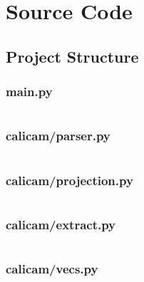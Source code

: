 \section{Source Code}

\subsection*{Project Structure}


\subsubsection*{main.py} \label{code:main}
\inputminted{python}{./calicam/main.py}

\subsubsection*{calicam/parser.py} \label{code:parser}
\inputminted{python}{./calicam/calicam/parser.py}

\subsubsection*{calicam/projection.py} \label{code:projection}
\inputminted{python}{./calicam/calicam/projection.py}

\subsubsection*{calicam/extract.py} \label{code:extract}
\inputminted{python}{./calicam/calicam/extract.py}

\subsubsection*{calicam/vecs.py} \label{code:vecsZ}
\inputminted{python}{./calicam/calicam/vecs.py}

